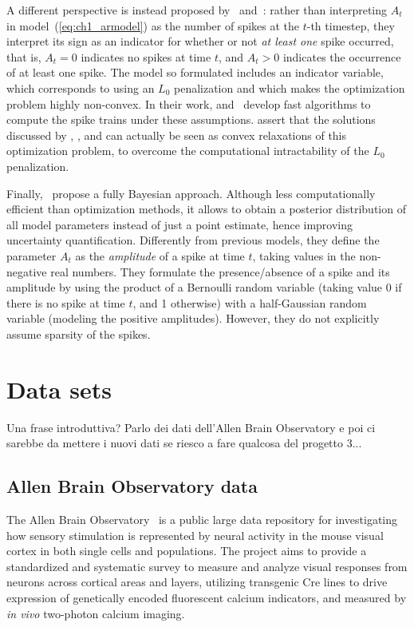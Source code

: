 A different perspective is instead proposed by~\citet{jewell2018} and~\citet{jewell2019}: rather than interpreting $A_t$ in model~(\ref{eq:ch1_armodel}) as the number of spikes at the $t$-th timestep, they interpret its sign as an indicator for whether or not \textit{at least one} spike occurred, that is, $A_t = 0$ indicates no spikes at time $t$, and $A_t>0$ indicates the occurrence of at least one spike. The model so formulated includes an indicator variable, which corresponds to using an $L_0$ penalization and which makes the optimization problem highly non-convex. 
In their work, \citet{jewell2018} and~\citet{jewell2019} develop fast algorithms to compute the spike trains under these assumptions.
\citet{jewell2018} assert that the solutions discussed by \citet{vogelstein2010}, \citet{friedrich2016}, and \citet{friedrich2017} can actually be seen as convex relaxations of this optimization problem, to overcome the computational intractability of the $L_0$ penalization. 

Finally,~\citet{pnevmatikakis2013} propose a fully Bayesian approach. Although less computationally efficient than optimization methods, it allows to obtain a posterior distribution of all model parameters instead of just a point estimate, hence improving uncertainty quantification.
Differently from previous models, they define the parameter $A_t$ as the \textit{amplitude} of a spike at time $t$, taking values in the non-negative real numbers.
They formulate the presence/absence of a spike and its amplitude by using the product of a Bernoulli random variable (taking value 0 if there is no spike at time $t$, and 1 otherwise) with a half-Gaussian random variable (modeling the positive amplitudes). However, they do not explicitly assume sparsity of the spikes.

\section{Data sets} 
Una frase introduttiva? Parlo dei dati dell'Allen Brain Observatory e poi ci sarebbe da mettere i nuovi dati se riesco a fare qualcosa del progetto 3...

\subsection{Allen Brain Observatory data}
The Allen Brain Observatory~\citep{allen} is a public large data repository for investigating how sensory stimulation is represented by neural activity in the mouse visual cortex in both single cells and populations.
The project aims to provide a standardized and systematic survey to measure and analyze visual responses from neurons across cortical areas and layers, utilizing transgenic Cre lines to drive expression of genetically encoded fluorescent calcium indicators, and measured by \textit{in vivo} two-photon calcium imaging.

